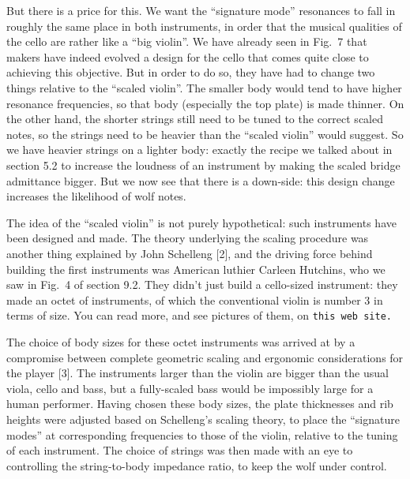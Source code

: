   But there is a price for this. We want the “signature mode” resonances to 
  fall in roughly the same place in both instruments, in order that the musical 
  qualities of the cello are rather like a “big violin”. We have already seen 
  in Fig.\ 7 that makers have indeed evolved a design for the cello that comes 
  quite close to achieving this objective. But in order to do so, they have had 
  to change two things relative to the “scaled violin”. The smaller body would 
  tend to have higher resonance frequencies, so that body (especially the top 
  plate) is made thinner. On the other hand, the shorter strings still need to 
  be tuned to the correct scaled notes, so the strings need to be heavier than 
  the “scaled violin” would suggest. So we have heavier strings on a lighter 
  body: exactly the recipe we talked about in section 5.2 to increase the 
  loudness of an instrument by making the scaled bridge admittance bigger. But 
  we now see that there is a down-side: this design change increases the 
  likelihood of wolf notes. 

  The idea of the “scaled violin” is not purely hypothetical: such instruments 
  have been designed and made. The theory underlying the scaling procedure was 
  another thing explained by John Schelleng [2], and the driving force behind 
  building the first instruments was American luthier Carleen Hutchins, who we 
  saw in Fig.\ 4 of section 9.2. They didn’t just build a cello-sized 
  instrument: they made an octet of instruments, of which the conventional 
  violin is number 3 in terms of size. You can read more, and see pictures of 
  them, on \tt{}this web site\rm{}. 

  The choice of body sizes for these octet instruments was arrived at by a 
  compromise between complete geometric scaling and ergonomic considerations 
  for the player [3]. The instruments larger than the violin are bigger than 
  the usual viola, cello and bass, but a fully-scaled bass would be impossibly 
  large for a human performer. Having chosen these body sizes, the plate 
  thicknesses and rib heights were adjusted based on Schelleng’s scaling 
  theory, to place the “signature modes” at corresponding frequencies to those 
  of the violin, relative to the tuning of each instrument. The choice of 
  strings was then made with an eye to controlling the string-to-body impedance 
  ratio, to keep the wolf under control. 

